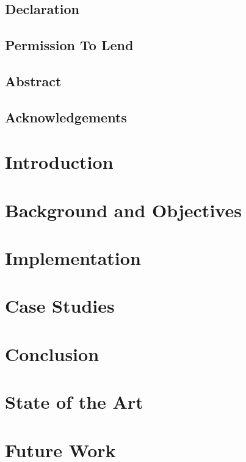 \documentclass{report}
\begin{document}
	\hypersetup{pageanchor=false}
	
	\hypersetup{pageanchor=true}


	\section*{Declaration}
	
	\pagebreak

	\section*{Permission To Lend}
	
	\pagebreak

	\section*{Abstract}
	
	\pagebreak

	\section*{Acknowledgements}
	
	\pagebreak

	\tableofcontents
	\cleardoublepage

	\chapter{Introduction} \label{introduction}
	

	\chapter{Background and Objectives} \label{background}
	

	\chapter{Implementation} \label{implementation}
	

	\chapter{Case Studies} \label{studies}
	

	\chapter{Conclusion} \label{conclusion}
	

	\chapter{State of the Art} \label{state_of_the_art}
	

	\chapter{Future Work} \label{future}
	

	\clearpage
	\printbibliography
\end{document}
